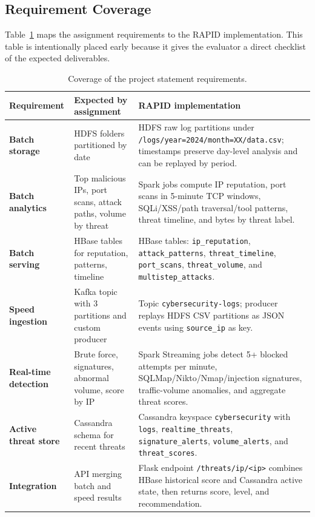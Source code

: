 \subsection{Requirement Coverage}

Table~\ref{tab:requirements-coverage} maps the assignment requirements to the RAPID implementation. This table is intentionally placed early because it gives the evaluator a direct checklist of the expected deliverables.

\begin{table}[H]
    \centering
    \scriptsize
    \caption{Coverage of the project statement requirements.}
    \label{tab:requirements-coverage}
    \begin{tabularx}{\textwidth}{>{\bfseries}p{} X X}
        \toprule
        Requirement & Expected by assignment & RAPID implementation \\
        \midrule
        Batch storage & HDFS folders partitioned by date & HDFS raw log partitions under \texttt{/logs/year=2024/month=XX/data.csv}; timestamps preserve day-level analysis and can be replayed by period. \\
        Batch analytics & Top malicious IPs, port scans, attack paths, volume by threat & Spark jobs compute IP reputation, port scans in 5-minute TCP windows, SQLi/XSS/path traversal/tool patterns, threat timeline, and bytes by threat label. \\
        Batch serving & HBase tables for reputation, patterns, timeline & HBase tables: \texttt{ip\_reputation}, \texttt{attack\_patterns}, \texttt{threat\_timeline}, \texttt{port\_scans}, \texttt{threat\_volume}, and \texttt{multistep\_attacks}. \\
        Speed ingestion & Kafka topic with 3 partitions and custom producer & Topic \texttt{cybersecurity-logs}; producer replays HDFS CSV partitions as JSON events using \texttt{source\_ip} as key. \\
        Real-time detection & Brute force, signatures, abnormal volume, score by IP & Spark Streaming jobs detect 5+ blocked attempts per minute, SQLMap/Nikto/Nmap/injection signatures, traffic-volume anomalies, and aggregate threat scores. \\
        Active threat store & Cassandra schema for recent threats & Cassandra keyspace \texttt{cybersecurity} with \texttt{logs}, \texttt{realtime\_threats}, \texttt{signature\_alerts}, \texttt{volume\_alerts}, and \texttt{threat\_scores}. \\
        Integration & API merging batch and speed results & Flask endpoint \texttt{/threats/ip/<ip>} combines HBase historical score and Cassandra active state, then returns score, level, and recommendation. \\

\end{tabularx}
\end{table}
